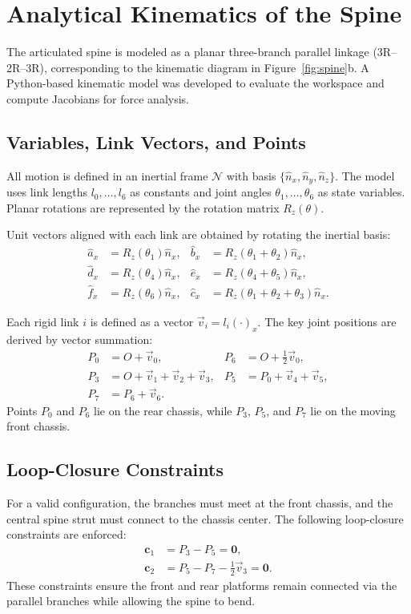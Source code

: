 \documentclass[11pt, a4paper]{article}
\begin{document}
\section{Analytical Kinematics of the Spine}
\label{sec:analytical_kinematics}

The articulated spine is modeled as a planar three-branch parallel linkage (3R–2R–3R), corresponding to the kinematic diagram in Figure~\ref{fig:spine}b. A Python-based kinematic model was developed to evaluate the workspace and compute Jacobians for force analysis.

\subsection{Variables, Link Vectors, and Points}
All motion is defined in an inertial frame $\mathcal{N}$ with basis $\{\hat{n}_x,\hat{n}_y,\hat{n}_z\}$. The model uses link lengths $l_0,\dots,l_6$ as constants and joint angles $\theta_1,\dots,\theta_6$ as state variables. Planar rotations are represented by the rotation matrix $R_z(\theta)$.

Unit vectors aligned with each link are obtained by rotating the inertial basis:
\begin{align}
    \hat{a}_x &= R_z(\theta_1)\hat{n}_x, & \hat{b}_x &= R_z(\theta_1+\theta_2)\hat{n}_x, \\
    \hat{d}_x &= R_z(\theta_4)\hat{n}_x, & \hat{e}_x &= R_z(\theta_4+\theta_5)\hat{n}_x, \\
    \hat{f}_x &= R_z(\theta_6)\hat{n}_x, & \hat{c}_x &= R_z(\theta_1+\theta_2+\theta_3)\hat{n}_x.
\end{align}

Each rigid link $i$ is defined as a vector $\vec{v}_i = l_i \hat{(\cdot)}_x$. The key joint positions are derived by vector summation:
\begin{align}
    P_0 &= O + \vec{v}_0, & P_6 &= O + \tfrac{1}{2}\vec{v}_0, \\
    P_3 &= O + \vec{v}_1 + \vec{v}_2 + \vec{v}_3, & P_5 &= P_0 + \vec{v}_4 + \vec{v}_5, \\
    P_7 &= P_6 + \vec{v}_6.
\end{align}
Points $P_0$ and $P_6$ lie on the rear chassis, while $P_3$, $P_5$, and $P_7$ lie on the moving front chassis.

\subsection{Loop-Closure Constraints}
For a valid configuration, the branches must meet at the front chassis, and the central spine strut must connect to the chassis center. The following loop-closure constraints are enforced:
\begin{align}
    \mathbf{c}_1 &= P_3 - P_5 = \mathbf{0}, \\
    \mathbf{c}_2 &= P_5 - P_7 - \tfrac{1}{2}\vec{v}_3 = \mathbf{0}.
\end{align}
These constraints ensure the front and rear platforms remain connected via the parallel branches while allowing the spine to bend.
\end{document}
